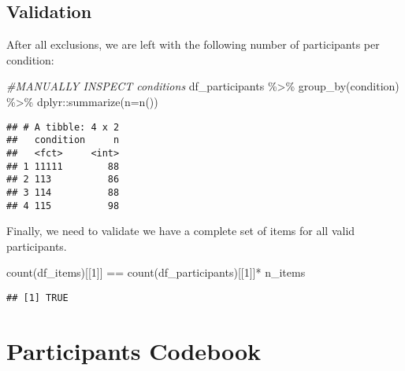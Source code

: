 \documentclass[
]{article}
\newenvironment{Shaded}{\begin{snugshade}}{\end{snugshade}}
\newcommand{\AttributeTok}[1]{\textcolor[rgb]{0.77,0.63,0.00}{#1}}
\newcommand{\CommentTok}[1]{\textcolor[rgb]{0.56,0.35,0.01}{\textit{#1}}}
\newcommand{\DecValTok}[1]{\textcolor[rgb]{0.00,0.00,0.81}{#1}}
\newcommand{\FunctionTok}[1]{\textcolor[rgb]{0.00,0.00,0.00}{#1}}
\newcommand{\NormalTok}[1]{#1}
\newcommand{\SpecialCharTok}[1]{\textcolor[rgb]{0.00,0.00,0.00}{#1}}
\begin{document}
\hypertarget{validation}{%
\subsection{Validation}\label{validation}}

After all exclusions, we are left with the following number of
participants per condition:

\begin{Shaded}
\begin{Highlighting}[]
\CommentTok{\#MANUALLY INSPECT conditions}
\NormalTok{df\_participants }\SpecialCharTok{\%\textgreater{}\%} \FunctionTok{group\_by}\NormalTok{(condition) }\SpecialCharTok{\%\textgreater{}\%} 
\NormalTok{  dplyr}\SpecialCharTok{::}\FunctionTok{summarize}\NormalTok{(}\AttributeTok{n=}\FunctionTok{n}\NormalTok{())}
\end{Highlighting}
\end{Shaded}

\begin{verbatim}
## # A tibble: 4 x 2
##   condition     n
##   <fct>     <int>
## 1 11111        88
## 2 113          86
## 3 114          88
## 4 115          98
\end{verbatim}

Finally, we need to validate we have a complete set of items for all
valid participants.

\begin{Shaded}
\begin{Highlighting}[]
\FunctionTok{count}\NormalTok{(df\_items)[[}\DecValTok{1}\NormalTok{]] }\SpecialCharTok{==} \FunctionTok{count}\NormalTok{(df\_participants)[[}\DecValTok{1}\NormalTok{]]}\SpecialCharTok{*}\NormalTok{ n\_items }
\end{Highlighting}
\end{Shaded}

\begin{verbatim}
## [1] TRUE
\end{verbatim}

\hypertarget{participants-codebook}{%
\section{Participants Codebook}\label{participants-codebook}}
\end{document}
